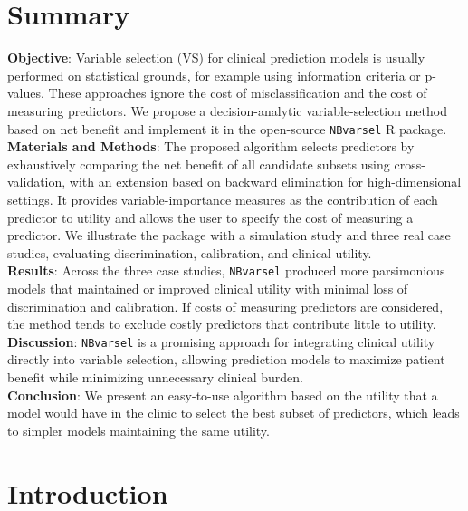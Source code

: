 \section*{Summary}\label{abstract}
\textbf{Objective}: Variable selection (VS) for clinical prediction models is usually performed on statistical grounds, for example using information criteria or p-values. These approaches ignore the cost of misclassification and the cost of measuring predictors. We propose a decision-analytic variable-selection method based on net benefit and implement it in the open-source \texttt{NBvarsel} R package. \\
\textbf{Materials and Methods}: The proposed algorithm selects predictors by exhaustively comparing the net benefit of all candidate subsets using cross-validation, with an extension based on backward elimination for high-dimensional settings. It provides variable-importance measures as the contribution of each predictor to utility and allows the user to specify the cost of measuring a predictor. We illustrate the package with a simulation study and three real case studies, evaluating discrimination, calibration, and clinical utility. \\
\textbf{Results}: Across the three case studies, \texttt{NBvarsel} produced more parsimonious models that maintained or improved clinical utility with minimal loss of discrimination and calibration. If costs of measuring predictors are considered, the method tends to exclude costly predictors that contribute little to utility. \\
\textbf{Discussion}: \texttt{NBvarsel} is a promising approach for integrating clinical utility directly into variable selection, allowing prediction models to maximize patient benefit while minimizing unnecessary clinical burden. \\
\textbf{Conclusion}: We present an easy-to-use algorithm based on the utility that a model would have in the clinic to select the best subset of predictors, which leads to simpler models maintaining the same utility.
 

\newpage

\section{Introduction}

